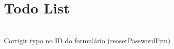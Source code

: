 \chapter{Todo List }
\hypertarget{todo}{}\label{todo}

\begin{DoxyRefList}
\item[Member \doxylink{autenticacao_8js_a77d47da9400302067f0fc5d40d19883b}{get\+Element\+By\+Id} (\textquotesingle{}login\+Form\textquotesingle{})?.add\+Event\+Listener(\textquotesingle{}submit\textquotesingle{}]\hfill \\
\label{todo__todo000001}%
%
Corrigir typo no ID do formulário (reoset\+Password\+Frm) 
\end{DoxyRefList}